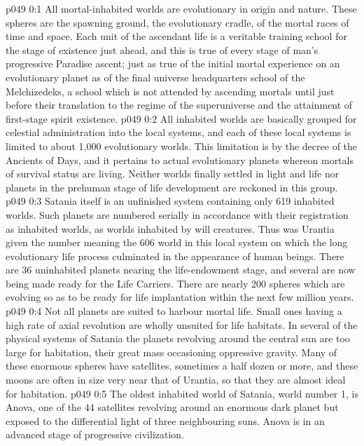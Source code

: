 \author{Melchizedek}
\vs p049 0:1 All mortal\hyp{}inhabited worlds are evolutionary in origin and nature. These spheres are the spawning ground, the evolutionary cradle, of the mortal races of time and space. Each unit of the ascendant life is a veritable training school for the stage of existence just ahead, and this is true of every stage of man’s progressive Paradise ascent; just as true of the initial mortal experience on an evolutionary planet as of the final universe headquarters school of the Melchizedeks, a school which is not attended by ascending mortals until just before their translation to the regime of the superuniverse and the attainment of first\hyp{}stage spirit existence.
\vs p049 0:2 \pc All inhabited worlds are basically grouped for celestial administration into the local systems, and each of these local systems is limited to about 1,000 evolutionary worlds. This limitation is by the decree of the Ancients of Days, and it pertains to actual evolutionary planets whereon mortals of survival status are living. Neither worlds finally settled in light and life nor planets in the prehuman stage of life development are reckoned in this group.
\vs p049 0:3 \pc Satania itself is an unfinished system containing only 619 inhabited worlds. Such planets are numbered serially in accordance with their registration as inhabited worlds, as worlds inhabited by will creatures. Thus was Urantia given the number  meaning the 606 world in this local system on which the long evolutionary life process culminated in the appearance of human beings. There are 36 uninhabited planets nearing the life\hyp{}endowment stage, and several are now being made ready for the Life Carriers. There are nearly 200 spheres which are evolving so as to be ready for life implantation within the next few million years.
\vs p049 0:4 Not all planets are suited to harbour mortal life. Small ones having a high rate of axial revolution are wholly unsuited for life habitats. In several of the physical systems of Satania the planets revolving around the central sun are too large for habitation, their great mass occasioning oppressive gravity. Many of these enormous spheres have satellites, sometimes a half dozen or more, and these moons are often in size very near that of Urantia, so that they are almost ideal for habitation.
\vs p049 0:5 The oldest inhabited world of Satania, world number 1, is Anova, one of the 44 satellites revolving around an enormous dark planet but exposed to the differential light of three neighbouring suns. Anova is in an advanced stage of progressive civilization.

